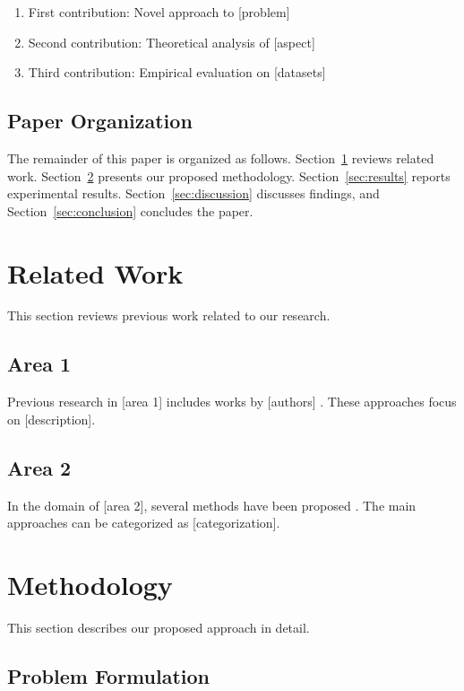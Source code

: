 \documentclass[twocolumn]{article}
\theoremstyle{definition}
\theoremstyle{remark}
\begin{document}
\begin{enumerate}
    \item First contribution: Novel approach to [problem]
    \item Second contribution: Theoretical analysis of [aspect]
    \item Third contribution: Empirical evaluation on [datasets]
\end{enumerate}

\subsection{Paper Organization}

The remainder of this paper is organized as follows. Section~\ref{sec:related} 
reviews related work. Section~\ref{sec:methodology} presents our proposed 
methodology. Section~\ref{sec:results} reports experimental results. 
Section~\ref{sec:discussion} discusses findings, and Section~\ref{sec:conclusion} 
concludes the paper.

\section{Related Work}
\label{sec:related}

This section reviews previous work related to our research.

\subsection{Area 1}

Previous research in [area 1] includes works by [authors] \cite{examplebook2022}. 
These approaches focus on [description].

\subsection{Area 2}

In the domain of [area 2], several methods have been proposed \cite{conference2023}. 
The main approaches can be categorized as [categorization].

\section{Methodology}
\label{sec:methodology}

This section describes our proposed approach in detail.

\subsection{Problem Formulation}
\end{document}
